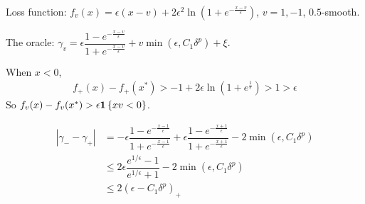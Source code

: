 \documentclass[11pt,letterpaper,english]{article}
\begin{document}
Loss function: $f_v(x) =\epsilon\left( x-v\right)+2\epsilon^2 \ln\left(1+e^{-\frac{x-v}{\epsilon}}  \right)$, $v= 1, -1$, $0.5$-smooth.


The oracle: $\gamma_v = \epsilon \dfrac{1-e^{-\frac{x-v}{\epsilon}}}{1+e^{-\frac{x-v}{\epsilon}}}+v \min \left( \epsilon, C_1 \delta^p \right)+\xi$.

When $x<0$, 
\begin{align*}
f_+(x)-f_+(x^*) > -1 +2\epsilon \ln\left( 1+e^{\frac{1}{\epsilon}} \right) >1>\epsilon
\end{align*}
So $f_v(x)-f_v(x^*)>\epsilon \mathbf{1}\left\{x v  < 0\right\}$.

\begin{align*}
|\gamma_--\gamma_+| &= -\epsilon \dfrac{1-e^{-\frac{x-1}{\epsilon}}}{1+e^{-\frac{x-1}{\epsilon}}} + \epsilon \dfrac{1-e^{-\frac{x+1}{\epsilon}}}{1+e^{-\frac{x+1}{\epsilon}}}-2 \min \left( \epsilon, C_1 \delta^p \right)\\
&\leq 2\epsilon \dfrac{e^{1/\epsilon}-1}{e^{1/\epsilon}+1}-2 \min \left( \epsilon, C_1 \delta^p \right)\\
&\leq 2\left( \epsilon -C_1\delta^p \right)_+
\end{align*}
\end{document}
